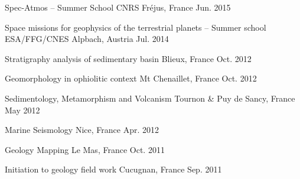 

\begin{cvhonors}

  \cvhonor
  	{Spec-Atmos -- Summer School}
  	{CNRS}
  	{Fréjus, France}
  	{Jun. 2015}

  \cvhonor
    {Space missions for geophysics of the terrestrial planets -- Summer school}
    {ESA/FFG/CNES}
    {Alpbach, Austria}
    {Jul. 2014}

\end{cvhonors}


\begin{cvhonors}

  \cvhonor
    {Stratigraphy analysis of sedimentary basin}
    {}
    {Blieux, France}
    {Oct. 2012}

  \cvhonor
    {Geomorphology in ophiolitic context}
    {}
    {Mt Chenaillet, France}
    {Oct. 2012}

  \cvhonor
    {Sedimentology, Metamorphism and Volcanism}
    {}
    {Tournon \& Puy de Sancy, France}
    {May 2012}

  \cvhonor
    {Marine Seismology}
    {}
    {Nice, France}
    {Apr. 2012}

  \cvhonor
    {Geology Mapping}
    {}
    {Le Mas, France}
    {Oct. 2011}

  \cvhonor
    {Initiation to geology field work}
    {}
    {Cucugnan, France}
    {Sep. 2011}

\end{cvhonors}
